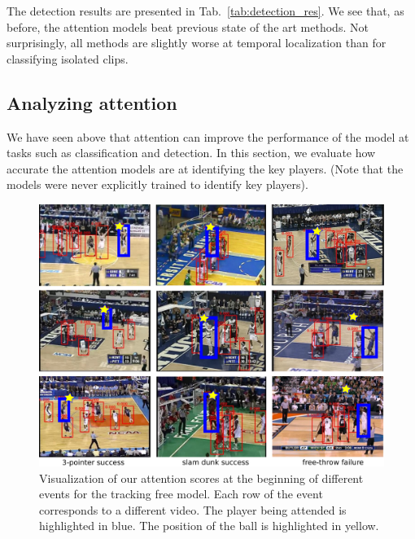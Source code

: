  The detection results
are presented in Tab.~\ref{tab:detection_res}.
We see that, as before, the attention models beat previous state of
the art methods.
Not surprisingly, all methods are slightly worse at temporal
localization
than for classifying
isolated clips.

\subsection{Analyzing attention}

We have seen above that attention can improve the performance of the
model at tasks such as classification and detection. 
In this section, we evaluate how accurate the attention models are at
identifying the key players. (Note that the models were never
explicitly trained to identify key players).



\begin{figure}[t!]
\begin{center}
   \includegraphics[width=1.0\linewidth]{images/visual_examples_v2.pdf}
\end{center}
   \caption{Visualization of our attention scores at the beginning of different events
     for the tracking free model.
Each row of the event corresponds to a different video.
The player being attended is highlighted in blue.
The position of the ball is highlighted in yellow.}
\label{fig:visual_attention}
\end{figure}



